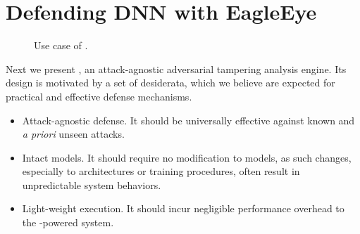 \section{Defending DNN with EagleEye}
\label{sec:model}



\begin{figure}
  \caption{Use case of \system. \label{fig:arch}}
\end{figure}


Next we present \system, an attack-agnostic adversarial tampering analysis engine. Its design is motivated by a set of desiderata, which we believe are expected for practical and effective defense mechanisms.

\begin{itemize}

\item Attack-agnostic defense. It should be universally effective against known and {\em a priori} unseen attacks.

\item Intact \dnn models. It should require no modification to \dnn models, as such changes, especially to \dnn architectures or training procedures, often result in unpredictable system behaviors.



\item Light-weight execution. It should incur negligible performance overhead to the \dl-powered system.

\end{itemize}
